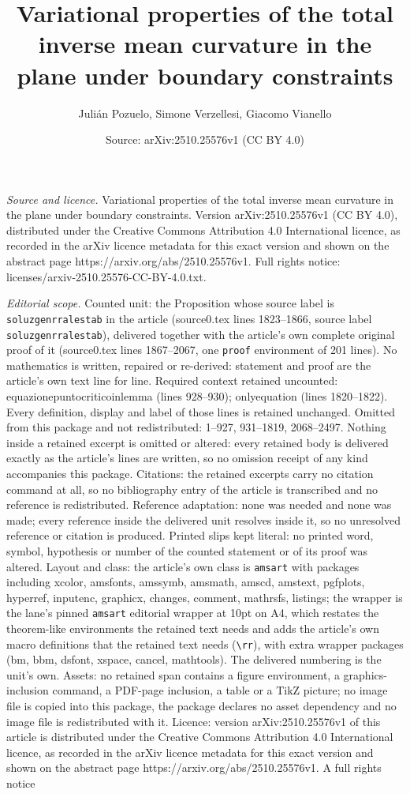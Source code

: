 \documentclass[10pt,a4paper]{amsart}
\title[Variational properties of the total inverse mean curvature i]{Variational properties of the total inverse mean curvature in the plane under boundary constraints}
\author{Juli\'an Pozuelo, Simone Verzellesi, Giacomo Vianello}
\date{Source: arXiv:2510.25576v1 (CC BY 4.0)}
\begin{document}
\maketitle

\noindent\emph{Source and licence.} Variational properties of the total inverse mean curvature in the plane under boundary constraints. Version arXiv:2510.25576v1 (CC BY 4.0), distributed under the Creative Commons Attribution 4.0 International licence, as recorded in the arXiv licence metadata for this exact version and shown on the abstract page https://arxiv.org/abs/2510.25576v1. Full rights notice: licenses/arxiv-2510.25576-CC-BY-4.0.txt.\par\smallskip

\noindent\textit{Editorial scope.} Counted unit: the Proposition whose source label is \texttt{soluzgenrralestab} in the article (source0.tex lines 1823--1866, source label \texttt{soluzgenrralestab}), delivered together with the article's own complete original proof of it (source0.tex lines 1867--2067, one \texttt{proof} environment of 201 lines). No mathematics is written, repaired or re-derived: statement and proof are the article's own text line for line. Required context retained uncounted: equazionepuntocriticoinlemma (lines 928--930); onlyequation (lines 1820--1822). Every definition, display and label of those lines is retained unchanged. Omitted from this package and not redistributed: 1--927, 931--1819, 2068--2497. Nothing inside a retained excerpt is omitted or altered: every retained body is delivered exactly as the article's lines are written, so no omission receipt of any kind accompanies this package. Citations: the retained excerpts carry no citation command at all, so no bibliography entry of the article is transcribed and no reference is redistributed. Reference adaptation: none was needed and none was made; every reference inside the delivered unit resolves inside it, so no unresolved reference or citation is produced. Printed slips kept literal: no printed word, symbol, hypothesis or number of the counted statement or of its proof was altered. Layout and class: the article's own class is \texttt{amsart} with packages including xcolor, amsfonts, amssymb, amsmath, amscd, amstext, pgfplots, hyperref, inputenc, graphicx, changes, comment, mathrsfs, listings; the wrapper is the lane's pinned \texttt{amsart} editorial wrapper at 10pt on A4, which restates the theorem-like environments the retained text needs and adds the article's own macro definitions that the retained text needs (\texttt{\textbackslash rr}), with extra wrapper packages (bm, bbm, dsfont, xspace, cancel, mathtools). The delivered numbering is the unit's own. Assets: no retained span contains a figure environment, a graphics-inclusion command, a PDF-page inclusion, a table or a TikZ picture; no image file is copied into this package, the package declares no asset dependency and no image file is redistributed with it. Licence: version arXiv:2510.25576v1 of this article is distributed under the Creative Commons Attribution 4.0 International licence, as recorded in the arXiv licence metadata for this exact version and shown on the abstract page https://arxiv.org/abs/2510.25576v1. A full rights notice 
\end{document}
